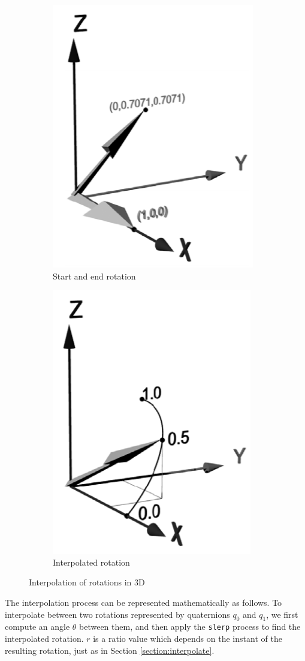 \begin{figure}[h!]
\centering
\begin{subfigure}{.5\textwidth}
  \centering
  \includegraphics[width=.4\linewidth]{images/3d_start_end_rotations.png}
  \caption{Start and end rotation}
\end{subfigure}%
\begin{subfigure}{.5\textwidth}
  \centering
  \includegraphics[width=.4\linewidth]{images/3d_interpolated_rotation.png}
  \caption{Interpolated rotation}
\end{subfigure}
\caption[Interpolation of rotations in 3D]{Interpolation of rotations in 3D \cite{ISO19141_moving_features}}
\label{fig:3d_interpolation}
\end{figure}

The interpolation process can be represented mathematically as follows. To interpolate between two rotations represented by quaternions \( q_0 \) and \( q_1 \), we first compute an angle \( \theta \) between them, and then apply the \lstinline{slerp} process to find the interpolated rotation. $r$ is a ratio value which depends on the instant of the resulting rotation, just as in Section \ref{section:interpolate}.

